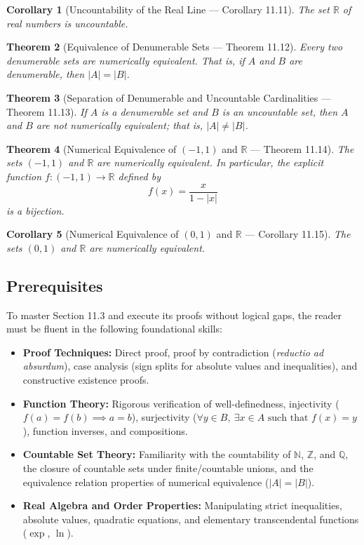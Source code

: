 \documentclass[11pt, letterpaper]{article}
\newtheorem{theorem}{Theorem}[section]
\newtheorem{corollary}[theorem]{Corollary}
\theoremstyle{definition}
\theoremstyle{remark}
\begin{document}
\begin{corollary}[Uncountability of the Real Line — Corollary 11.11]
The set $\mathbb{R}$ of real numbers is uncountable.
\end{corollary}

\begin{theorem}[Equivalence of Denumerable Sets — Theorem 11.12]
Every two denumerable sets are numerically equivalent. That is, if $A$ and $B$ are denumerable, then $|A| = |B|$.
\end{theorem}

\begin{theorem}[Separation of Denumerable and Uncountable Cardinalities — Theorem 11.13]
If $A$ is a denumerable set and $B$ is an uncountable set, then $A$ and $B$ are not numerically equivalent; that is, $|A| \neq |B|$.
\end{theorem}

\begin{theorem}[Numerical Equivalence of $(-1, 1)$ and $\mathbb{R}$ — Theorem 11.14]
The sets $(-1, 1)$ and $\mathbb{R}$ are numerically equivalent. In particular, the explicit function $f : (-1, 1) \to \mathbb{R}$ defined by
\[
f(x) = \frac{x}{1 - |x|}
\]
is a bijection.
\end{theorem}

\begin{corollary}[Numerical Equivalence of $(0, 1)$ and $\mathbb{R}$ — Corollary 11.15]
The sets $(0, 1)$ and $\mathbb{R}$ are numerically equivalent.
\end{corollary}

\subsection{Prerequisites}

To master Section 11.3 and execute its proofs without logical gaps, the reader must be fluent in the following foundational skills:
\begin{itemize}
    \item \textbf{Proof Techniques:} Direct proof, proof by contradiction (\emph{reductio ad absurdum}), case analysis (sign splits for absolute values and inequalities), and constructive existence proofs.
    \item \textbf{Function Theory:} Rigorous verification of well-definedness, injectivity ($f(a) = f(b) \implies a = b$), surjectivity ($\forall y \in B,\ \exists x \in A \text{ such that } f(x) = y$), function inverses, and compositions.
    \item \textbf{Countable Set Theory:} Familiarity with the countability of $\mathbb{N}$, $\mathbb{Z}$, and $\mathbb{Q}$, the closure of countable sets under finite/countable unions, and the equivalence relation properties of numerical equivalence ($|A| = |B|$).
    \item \textbf{Real Algebra and Order Properties:} Manipulating strict inequalities, absolute values, quadratic equations, and elementary transcendental functions ($\exp$, $\ln$).
\end{itemize}
\end{document}
